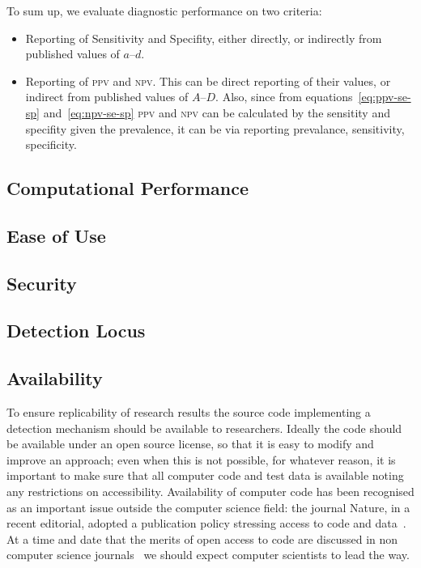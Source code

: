 \documentclass[conference]{IEEEtran}
\begin{document}
To sum up, we evaluate diagnostic performance on two criteria:

\begin{itemize}
\item Reporting of Sensitivity and Specifity, either directly, or
  indirectly from published values of $a$--$d$.
\item Reporting of \textsc{ppv} and \textsc{npv}. This can be direct
  reporting of their values, or indirect from published values of
  $A$--$D$. Also, since from equations~\ref{eq:ppv-se-sp}
  and~\ref{eq:npv-se-sp} \textsc{ppv} and \textsc{npv} can be
  calculated by the sensitity and specifity given the prevalence, it
  can be via reporting prevalance, sensitivity, specificity.
\end{itemize}
 
\subsection{Computational Performance}

\subsection{Ease of Use}

\subsection{Security}

\subsection{Detection Locus}

\subsection{Availability}

To ensure replicability of research results the source code
implementing a detection mechanism should be available to researchers.
Ideally the code should be available under an open source license, so
that it is easy to modify and improve an approach; even when this is
not possible, for whatever reason, it is important to make sure that
all computer code and test data is available noting any restrictions
on accessibility. Availability of computer code has been recognised as
an important issue outside the computer science field: the journal
Nature, in a recent editorial, adopted a publication policy stressing
access to code and data~\cite{nature2014}. At a time and date that the
merits of open access to code are discussed in non computer science
journals~\cite{easterbrook2014} we should expect computer scientists
to lead the way.
\end{document}

